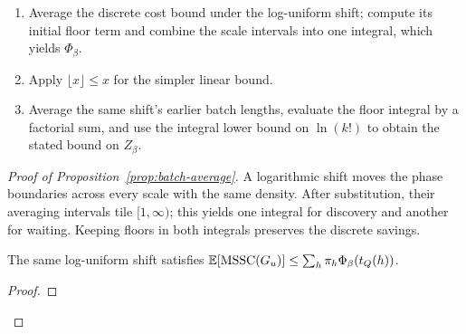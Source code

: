 \begin{proofstrategy}
\begin{enumerate}
\item Average the discrete cost bound under the log-uniform shift; compute
      its initial floor term and combine the scale intervals into one
      integral, which yields $\Phi_\beta$.
\item Apply $\lfloor x\rfloor\le x$ for the simpler linear bound.
\item Average the same shift's earlier batch lengths, evaluate the
      floor integral by a factorial sum, and use the integral lower bound
      on $\ln(k!)$ to obtain the stated bound on $Z_\beta$.
\end{enumerate}
\end{proofstrategy}

\begin{proof}[Proof of Proposition~\ref{prop:batch-average}]
A logarithmic shift moves the phase boundaries across every scale
with the same density. After substitution, their averaging intervals
tile $[1,\infty)$; this yields one integral for discovery and another
for waiting. Keeping floors in both integrals preserves the discrete savings.

\begin{claim}
\label{clm:batch-average-first-cover}
The same log-uniform shift satisfies
$\mathbb E[\operatorname{MSSC}(G_u)]\le\sum_h\pi_h\Phi_\beta(t_Q(h))$.
\end{claim}
\begin{proof}


\end{proof}
\end{proof}
